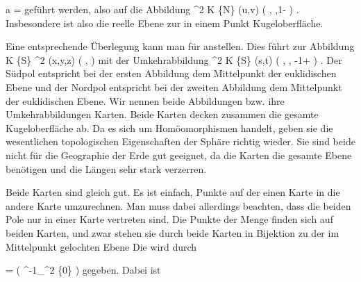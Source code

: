 {\mavergleichskette
{\vergleichskette
{ a
}
{ = }{ {  }
}
{  }{
}
{    }{
}
{   }{
}
}
{}{}{}
geführt werden, also auf die Abbildung
\maabbeledisp {} { \R^2 } { K \setminus \{N\}
} { (u,v) } { \left(  {  }, {  } ,1- {  }  \right)
} {.}
Insbesondere ist also die reelle Ebene
zur in einem Punkt  Kugeloberfläche.

Eine entsprechende Überlegung kann man für
 anstellen. Dies führt zur Abbildung
\maabbeledisp {\beta} { K \setminus \{S\} } { \R^2
} { (x,y,z) } { \left(  {  }, {  }  \right)
} {}
mit der Umkehrabbildung
\maabbeledisp {} { \R^2 } { K \setminus \{S\}
} { (s,t) } { \left(  {  }, {  }, -1+ {  }  \right)
} {.}
Der Südpol entspricht bei der ersten Abbildung dem Mittelpunkt der euklidischen Ebene und der Nordpol entspricht bei der zweiten Abbildung dem Mittelpunkt der euklidischen Ebene. Wir nennen beide Abbildungen bzw. ihre Umkehrabbildungen Karten. Beide Karten decken zusammen die gesamte Kugeloberfläche ab. Da es sich um Homöomorphismen handelt, geben sie die wesentlichen topologischen Eigenschaften der Sphäre richtig wieder. Sie sind beide nicht für die Geographie der Erde gut geeignet, da die Karten die gesamte Ebene benötigen und die Längen sehr stark verzerren.

Beide Karten sind gleich gut. Es ist einfach, Punkte
 {} {}
auf der einen Karte in die andere Karte umzurechnen. Man muss dabei allerdings beachten, dass die beiden Pole nur in einer Karte vertreten sind. Die Punkte der Menge
 finden sich auf beiden Karten, und zwar stehen sie durch beide Karten in Bijektion zu der im Mittelpunkt gelochten Ebene
 Die  {}
 {} {}
wird durch

\mavergleichskette
{\vergleichskette
{ \psi
}
{ = }{ \beta \circ \left(  \alpha^{-1}\!\mid_{\R^2 \setminus \{0\} }  \right)
}
{  }{
}
{    }{
}
{   }{
}
}
{}{}{}
gegeben. Dabei ist

}
